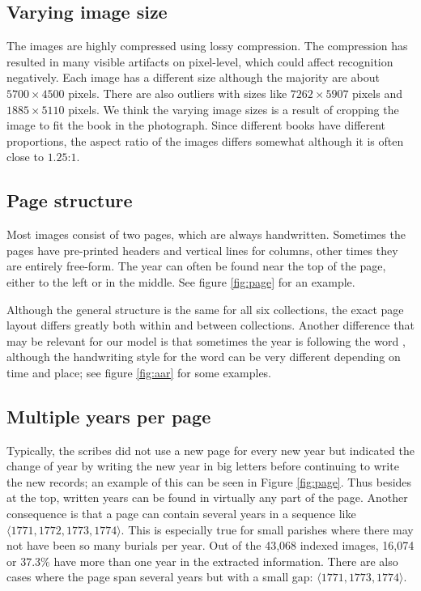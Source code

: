 \subsection{Varying image size}

The images are highly compressed using lossy compression. The compression has resulted in many visible artifacts on pixel-level, which could affect recognition negatively. Each image has a different size although the majority are about $5700 \times 4500$ pixels. There are also outliers with sizes like $7262 \times 5907$ pixels and $1885 \times 5110$ pixels. We think the varying image sizes is a result of cropping the image to fit the book in the photograph.
Since different books have different proportions, the aspect ratio of the images differs somewhat although it is often close to $1.25$:$1$.

\subsection{Page structure}

Most images consist of two pages, which are always handwritten. Sometimes the pages have pre-printed headers and vertical lines for columns, other times they are entirely free-form.
The year can often be found near the top of the page, either to the left or in the middle. See figure \ref{fig:page} for an example.



Although the general structure is the same for all six collections, the exact page layout differs greatly both within and between collections. Another difference that may be relevant for our model is that sometimes the year is following the word , although the handwriting style for the word can be very different depending on time and place; see figure \ref{fig:aar} for some examples.


\subsection{Multiple years per page} \label{sssec:swe_multiyear}

Typically, the scribes did not use a new page for every new year but indicated the change of year by writing the new year in big letters before continuing to write the new records; an example of this can be seen in Figure \ref{fig:page}.
Thus besides at the top, written years can be found in virtually any part of the page. Another consequence is that a page can contain several years in a sequence like $\langle 1771, 1772, 1773, 1774 \rangle$. This is especially true for small parishes where there may not have been so many burials per year. Out of the 43,068 indexed images, 16,074 or $37.3\%$ have more than one year in the extracted information. There are also cases where the page span several years but with a small gap: $\langle 1771, 1773, 1774 \rangle$.


